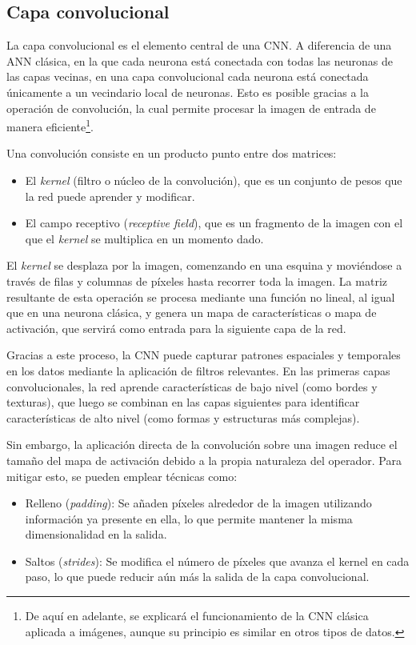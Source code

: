 \subsection{Capa convolucional}
La capa convolucional es el elemento central de una CNN. A diferencia de una ANN clásica, en la que cada neurona está conectada con todas las neuronas de las capas vecinas, en una capa convolucional cada neurona está conectada únicamente a un vecindario local de neuronas. Esto es posible gracias a la operación de convolución, la cual permite procesar la imagen de entrada de manera eficiente\footnote{De aquí en adelante, se explicará el funcionamiento de la CNN clásica aplicada a imágenes, aunque su principio es similar en otros tipos de datos.}.

Una convolución consiste en un producto punto entre dos matrices:
\begin{itemize}
    \item El \textit{kernel} (filtro o núcleo de la convolución), que es un conjunto de pesos que la red puede aprender y modificar.
    \item El campo receptivo (\textit{receptive field}), que es un fragmento de la imagen con el que el \textit{kernel} se multiplica en un momento dado.
\end{itemize}

El \textit{kernel} se desplaza por la imagen, comenzando en una esquina y moviéndose a través de filas y columnas de píxeles hasta recorrer toda la imagen. La matriz resultante de esta operación se procesa mediante una función no lineal, al igual que en una neurona clásica, y genera un mapa de características o mapa de activación, que servirá como entrada para la siguiente capa de la red.

Gracias a este proceso, la CNN puede capturar patrones espaciales y temporales en los datos mediante la aplicación de filtros relevantes. En las primeras capas convolucionales, la red aprende características de bajo nivel (como bordes y texturas), que luego se combinan en las capas siguientes para identificar características de alto nivel (como formas y estructuras más complejas).

Sin embargo, la aplicación directa de la convolución sobre una imagen reduce el tamaño del mapa de activación debido a la propia naturaleza del operador. Para mitigar esto, se pueden emplear técnicas como:
\begin{itemize}
    \item Relleno (\textit{padding}): Se añaden píxeles alrededor de la imagen utilizando información ya presente en ella, lo que permite mantener la misma dimensionalidad en la salida.
    \item Saltos (\textit{strides}): Se modifica el número de píxeles que avanza el kernel en cada paso, lo que puede reducir aún más la salida de la capa convolucional.
\end{itemize}


